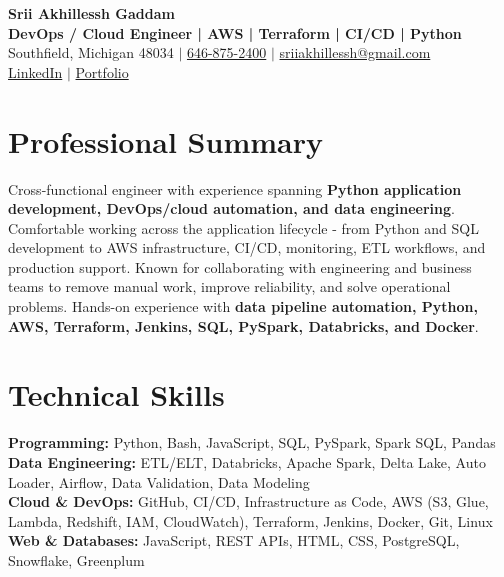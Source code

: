 \documentclass[letterpaper,10pt]{article}
\begin{document}
\fontsize{9.35pt}{10.45pt}\selectfont

\begin{center}
    {\LARGE \textbf{Srii Akhillessh Gaddam}} \\[-1pt]
    \textbf{DevOps / Cloud Engineer | AWS | Terraform | CI/CD | Python} \\[2pt]
    Southfield, Michigan 48034 $|$
    \href{tel:6468752400}{646-875-2400} $|$
    \href{mailto:sriiakhillessh@gmail.com}{sriiakhillessh@gmail.com} \\[1pt]
    \href{https://www.linkedin.com/in/srii-akhiilessh-gaddam-b48668191/}{LinkedIn} $|$
    \href{https://sriiakhillesshg.github.io/portfolio/}{Portfolio}
\end{center}
\vspace{-8pt}

\section{Professional Summary}
\small{Cross-functional engineer with experience spanning \textbf{Python application development, DevOps/cloud automation, and data engineering}. Comfortable working across the application lifecycle - from Python and SQL development to AWS infrastructure, CI/CD, monitoring, ETL workflows, and production support. Known for collaborating with engineering and business teams to remove manual work, improve reliability, and solve operational problems. Hands-on experience with \textbf{data pipeline automation, Python, AWS, Terraform, Jenkins, SQL, PySpark, Databricks, and Docker}.}

\section{Technical Skills}
\small{
\textbf{Programming:} Python, Bash, JavaScript, SQL, PySpark, Spark SQL, Pandas \\
\textbf{Data Engineering:} ETL/ELT, Databricks, Apache Spark, Delta Lake, Auto Loader, Airflow, Data Validation, Data Modeling \\
\textbf{Cloud \& DevOps:} GitHub, CI/CD, Infrastructure as Code, AWS (S3, Glue, Lambda, Redshift, IAM, CloudWatch), Terraform, Jenkins, Docker, Git, Linux \\
\textbf{Web \& Databases:} JavaScript, REST APIs, HTML, CSS, PostgreSQL, Snowflake, Greenplum
}
\end{document}
